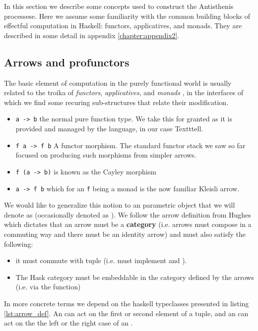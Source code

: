 In this section we describe some concepts used to construct the
Antisthenis processese. Here we assume some familiarity with the
common building blocks of effectful computation in Haskell: functors,
applicatives, and monads. They are described in some detail in
appendix \ref{chapter:appendix2}.

\subsection{Arrows and profunctors}

The basic element of computation in the purely functional world is
usually related to the troika of \emph{functors}, \emph{applicatives},
and \emph{monads} \cite{yorgeyTypeclassopedia2009}, in the interfaces
of which we find some recuring sub-structures that relate their
modification.

\begin{itemize}
\item \texttt{a -> b} the normal pure function type. We take this for granted as
it is provided and managed by the language, in our case Textttell.
\item \texttt{f a -> f b} A functor morphism. The standard functor stack we saw
so far focused on producing such morphisms from simpler arrows.
\item \texttt{f (a -> b)} is known as the Cayley morphism
\item \texttt{a -> f b} which for an \texttt{f} being a monad is the now familiar
Kleisli arrow.
\end{itemize}

We would like to generalize this notion to an parametric object that
we will denote as \hask{~>} (occasionally denoted as  ). We
follow the arrow definition from Hughes
\cite{hughesProgrammingArrows2005} which dictates that an arrow must
be a \textbf{category} (i.e. arrows must compose in a commuting way
and there must be an identity arrow) and must also satisfy the
following:

\begin{itemize}
\item it must commute with tuple (i.e. must implement  and
  ).
\item The Hask category must be embeddable in the category defined by the
arrows (i.e. via the  function)
\end{itemize}

In more concrete terms we depend on the haskell typeclasses presented
in listing \ref{lst:arrow_def}. An  can act on the first
or second element of a tuple, and an  can act on the
the left or the right case of an .

